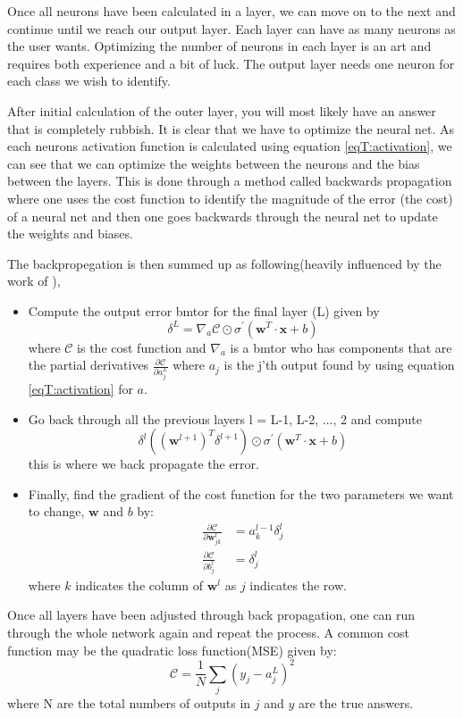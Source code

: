 Once all neurons have been calculated in a layer, we can move on to the next and continue until we reach our output layer. Each layer can have as many neurons as the user wants. Optimizing the number of neurons in each layer is an art and requires both experience and a bit of luck. The output layer needs one neuron for each class we wish to identify.

After initial calculation of the outer layer, you will most likely have an answer that is completely rubbish. It is clear that we have to optimize the neural net. As each neurons activation function is calculated using equation \eqref{eqT:activation}, we can see that we can optimize the weights between the neurons and the bias between the layers. This is done through a method called backwards propagation where one uses the cost function to identify the magnitude of the error (the cost) of a neural net and then one goes backwards through the neural net to update the weights and biases.

The backpropegation is then summed up as following(heavily influenced by the work of \citet{Nielsen}),
\begin{itemize}
    \item Compute the output error bmtor for the final layer (L) given by
    \begin{equation*}
        \delta^L = \nabla_a \mathcal{C} \odot \sigma^{'}(\bm{w}^T \cdot \bm{x} + b)
    \end{equation*}
    where $\mathcal{C}$ is the cost function and $\nabla_a$ is a bmtor who has components that are the partial derivatives $\frac{\partial \mathcal{C}}{\partial a_j^L}$ where $a_j$ is the j'th output found by using equation \eqref{eqT:activation} for $a$.
    \item Go back through all the previous layers l = L-1, L-2, ..., 2 and compute
    \begin{equation*}
        \delta^l ((\bm{w}^{l + 1})^T \delta^{l + 1}) \odot \sigma^{'}(\bm{w}^T \cdot \bm{x} + b)
    \end{equation*}
    this is where we back propagate the error.
    \item Finally, find the gradient of the cost function for the two parameters we want to change, $\bm{w}$ and $b$ by:
    \begin{align*}
        \frac{\partial \mathcal{C}}{\partial \bm{w}_{jk}^l} &= a_k^{l-1}\delta_{j}^{l} \\
        \frac{\partial \mathcal{C}}{\partial b_{j}^l} &= \delta_{j}^{l}
    \end{align*}
    where $k$ indicates the column of $\bm{w}^l$ as $j$ indicates the row.
\end{itemize}
Once all layers have been adjusted through back propagation, one can run through the whole network again and repeat the process. A common cost function may be the quadratic loss function(MSE) given by:
\begin{equation}
    \mathcal{C} = \frac{1}{N} \sum\limits_{j} (y_j - a_j^L)^2
\end{equation}
where N are the total numbers of outputs in $j$ and $y$ are the true answers.

